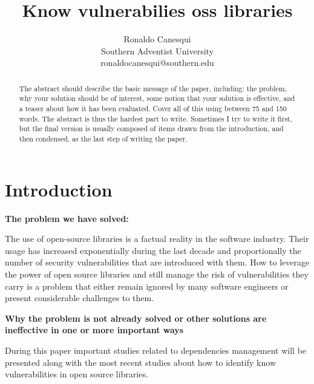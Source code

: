 \documentclass[pdf,bookmarks,colorlinks=true]{IEEEtran}
\title{\bf Know vulnerabilies oss libraries}
\author{Ronaldo Canesqui\\
Southern Adventist University\\
ronaldocanesqui@southern.edu
}
\begin{document}
\maketitle

\begin{abstract}

The abstract should describe the basic message of the paper, including: the
problem, why your solution should be of interest, some notion that your
solution is effective, and a teaser about how it has been evaluated. Cover all
of this using between 75 and 150 words. The abstract is thus the hardest part
to write. Sometimes I try to write it first, but the final version is usually
composed of items drawn from the introduction, and then condensed, as the last
step of writing the paper.

\end{abstract}



\section{Introduction}
\label{sec:Introduction}

\textbf{The problem we have solved:}

The use of open-source libraries is a factual reality in the software industry. Their usage has increased exponentially during the last decade and proportionally the number of security vulnerabilities that are introduced with them.  
How to leverage the power of open source libraries and still manage the risk of vulnerabilities they carry is a problem that either remain ignored by many software engineers or present considerable challenges to them.



\textbf{Why the problem is not already solved or other solutions
are ineffective in one or more important ways}

During this paper important studies related to dependencies management will be presented along with the most recent studies about how to identify know vulnerabilities in open source libraries.
\end{document}
